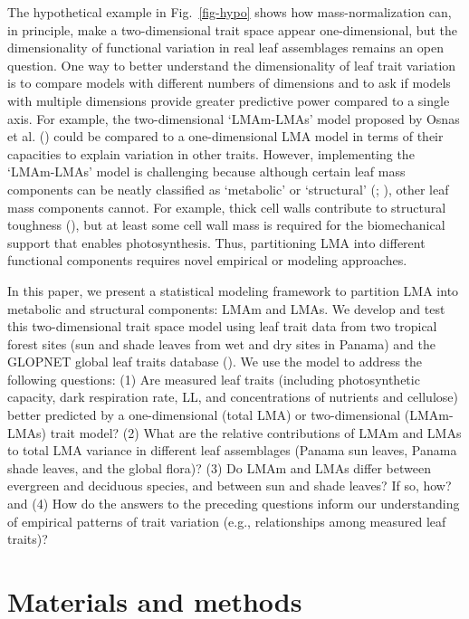\documentclass[
  12pt,
  letterpaper,
  DIV=11,
  numbers=noendperiod]{scrartcl}
\begin{document}
The hypothetical example in Fig.~\ref{fig-hypo} shows how
mass-normalization can, in principle, make a two-dimensional trait space
appear one-dimensional, but the dimensionality of functional variation
in real leaf assemblages remains an open question. One way to better
understand the dimensionality of leaf trait variation is to compare
models with different numbers of dimensions and to ask if models with
multiple dimensions provide greater predictive power compared to a
single axis. For example, the two-dimensional `LMAm-LMAs' model proposed
by Osnas et al. () could be compared to a
one-dimensional LMA model in terms of their capacities to explain
variation in other traits. However, implementing the `LMAm-LMAs' model
is challenging because although certain leaf mass components can be
neatly classified as `metabolic' or `structural'
(;
), other leaf mass components
cannot. For example, thick cell walls contribute to structural toughness
(), but at least some cell
wall mass is required for the biomechanical support that enables
photosynthesis. Thus, partitioning LMA into different functional
components requires novel empirical or modeling approaches.

In this paper, we present a statistical modeling framework to partition
LMA into metabolic and structural components: LMAm and LMAs. We develop
and test this two-dimensional trait space model using leaf trait data
from two tropical forest sites (sun and shade leaves from wet and dry
sites in Panama) and the GLOPNET global leaf traits database
(). We use the model to
address the following questions: (1) Are measured leaf traits (including
photosynthetic capacity, dark respiration rate, LL, and concentrations
of nutrients and cellulose) better predicted by a one-dimensional (total
LMA) or two-dimensional (LMAm-LMAs) trait model? (2) What are the
relative contributions of LMAm and LMAs to total LMA variance in
different leaf assemblages (Panama sun leaves, Panama shade leaves, and
the global flora)? (3) Do LMAm and LMAs differ between evergreen and
deciduous species, and between sun and shade leaves? If so, how? and (4)
How do the answers to the preceding questions inform our understanding
of empirical patterns of trait variation (e.g., relationships among
measured leaf traits)?

\section{Materials and methods}\label{materials-and-methods}
\end{document}

